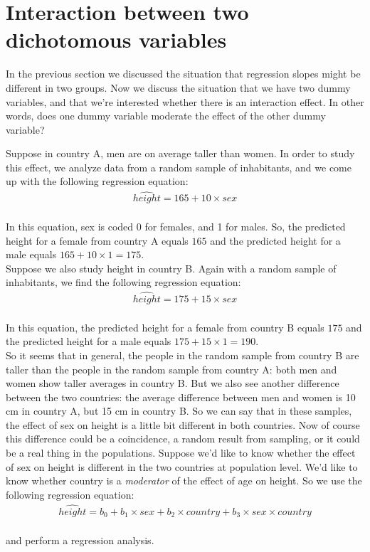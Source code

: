 \documentclass[]{report}\usepackage[]{graphicx}\usepackage[]{color}
\begin{document}
\section{Interaction between two dichotomous variables}

In the previous section we discussed the situation that regression slopes might be different in two groups. Now we discuss the situation that we have two dummy variables, and that we're interested whether there is an interaction effect. In other words, does one dummy variable moderate the effect of the other dummy variable?

Suppose in country A, men are on average taller than women. In order to study this effect, we analyze data from a random sample of inhabitants, and we come up with the following regression equation:
\\
\begin{eqnarray} 
\widehat{height} = 165 + 10  \times sex  \nonumber
\end{eqnarray}
\\
In this equation, sex is coded 0 for females, and 1 for males. So, the predicted height for a female from country A equals $165$ and the predicted height for a male equals $165 + 10 \times 1 = 175$.\\


Suppose we also study height in country B. Again with a random sample of inhabitants, we find the following regression equation:
\\
\begin{eqnarray} 
\widehat{height} = 175 + 15  \times sex  \nonumber
\end{eqnarray}
\\
In this equation, the predicted height for a female from country B equals $175$ and the predicted height for a male equals $175 + 15 \times 1 = 190$.\\

So it seems that in general, the people in the random sample from country B are taller than the people in the random sample from country A: both men and women show taller averages in country B. But we also see another difference between the two countries: the average difference between men and women is 10 cm in country A, but 15 cm in country B. So we can say that in these samples, the effect of sex on height is a little bit different in both countries. Now of course this difference could be a coincidence, a random result from sampling, or it could be a real thing in the populations. Suppose we'd like to know whether the effect of sex on height is different in the two countries at population level. We'd like to know whether country is a \textit{moderator} of the effect of age on height. So we use the following regression equation:
\\
\begin{eqnarray} 
\widehat{height} = b_0 + b_1  \times sex + b_2 \times country +  b_3 \times sex \times country  \nonumber
\end{eqnarray}
\\
and perform a regression analysis. 
\end{document}
